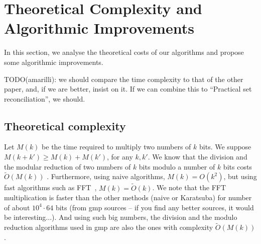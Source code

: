 \documentclass[11pt]{llncs}
\newcommand{\Oapp}{\ensuremath{\tilde{O}}}
\begin{document}
\section{Theoretical Complexity and Algorithmic Improvements}

In this section, we analyse the theoretical costs of our algorithms and propose some algorithmic improvements.

TODO(amarilli): we should compare the time complexity to that of the other
paper, and, if we are better, insist on it. If we can combine this to
``Practical set reconciliation'', we should.

\subsection{Theoretical complexity}

Let $M(k)$ be the time required to multiply two numbers of $k$ bits.
We suppose $M(k+k') \ge M(k) + M(k')$, for any $k,k'$.
We know that the division and the modular reduction of two numbers of $k$ bits modulo a number of $k$ bits costs $\Oapp(M(k))$ \cite{burnikel1998fast}.
Furthermore, using naive algorithms, $M(k) = O(k^2)$, but using fast algorithms such as FFT~\cite{schonhage1971schnelle}, $M(k) = \Oapp(k)$.
We note that the FFT multiplication is faster than the other methods (naive or Karatsuba) for number of about $10^4 \cdot 64$ bits (from gmp sources -- if you find any better sources, it would be interesting...).
And using such big numbers, the division and the modulo reduction algorithms used in gmp are also the ones with complexity $\Oapp(M(k))$.
\end{document}
